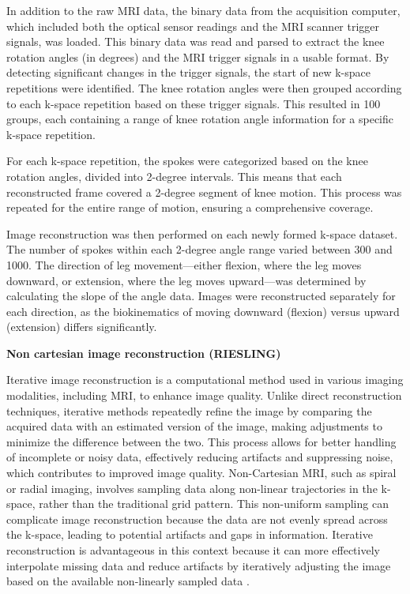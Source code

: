 \documentclass{micro-econ-thesis}
\begin{document}
In addition to the raw MRI data, the binary data from the acquisition computer, which included both the optical sensor readings and the MRI scanner trigger signals, was loaded. This binary data was read and parsed to extract the knee rotation angles (in degrees) and the MRI trigger signals in a usable format. By detecting significant changes in the trigger signals, the start of new k-space repetitions were identified. The knee rotation angles were then grouped according to each k-space repetition based on these trigger signals. This resulted in 100 groups, each containing a range of knee rotation angle information for a specific k-space repetition. 

For each k-space repetition, the spokes were categorized based on the knee rotation angles, divided into 2-degree intervals. This means that each reconstructed frame covered a 2-degree segment of knee motion. This process was repeated for the entire range of motion, ensuring a comprehensive coverage.  

Image reconstruction was then performed on each newly formed k-space dataset. The number of spokes within each 2-degree angle range varied between 300 and 1000. The direction of leg movement—either flexion, where the leg moves downward, or extension, where the leg moves upward—was determined by calculating the slope of the angle data. Images were reconstructed separately for each direction, as the biokinematics of moving downward (flexion) versus upward (extension) differs significantly.  

\textbf{Non cartesian image reconstruction (RIESLING)}

Iterative image reconstruction is a computational method used in various imaging modalities, including MRI, to enhance image quality. Unlike direct reconstruction techniques, iterative methods repeatedly refine the image by comparing the acquired data with an estimated version of the image, making adjustments to minimize the difference between the two. This process allows for better handling of incomplete or noisy data, effectively reducing artifacts and suppressing noise, which contributes to improved image quality. Non-Cartesian MRI, such as spiral or radial imaging, involves sampling data along non-linear trajectories in the k-space, rather than the traditional grid pattern. This non-uniform sampling can complicate image reconstruction because the data are not evenly spread across the k-space, leading to potential artifacts and gaps in information. Iterative reconstruction is advantageous in this context because it can more effectively interpolate missing data and reduce artifacts by iteratively adjusting the image based on the available non-linearly sampled data \parencite{block_undersampled_2007}.
\end{document}
